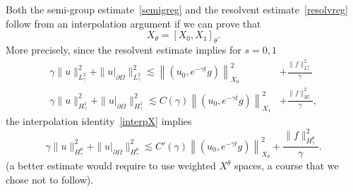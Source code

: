 \documentclass[AHL,Unicode,longabstracts,published]{cedram}
\begin{document}
Both the semi-group estimate~\eqref{semigreg} and the resolvent estimate~\eqref{resolvreg} follow from an interpolation argument if we can prove that
\begin{equation}\label{interpX}
X_\theta=[X_0,X_1]_\theta.
\end{equation}
More precisely, since the resolvent estimate implies for $s=0,1$
\begin{align*}
\gamma\|u\|_{L^2_\gamma}^2+\|u|_{\partial\Omega}\|^2_{L^2_\gamma}\lesssim \left\|\left(u_0,e^{-\gamma t}g\right)\right\|_{X_0}^2 &+\frac{\|f\|_{L^2_\gamma}^2}{\gamma}\\
\gamma\|u\|_{H^1_\gamma}^2+\|u|_{\partial\Omega}\|^2_{H^1_\gamma}\lesssim C(\gamma)\left\|\left(u_0,e^{-\gamma t}g\right)\right\|_{X_1}^2 &+\frac{\|f\|_{H^1_\gamma}^2}{\gamma},
\end{align*}
the interpolation identity~\eqref{interpX} implies
\begin{equation}\label{resolvsupersharp}
\gamma\|u\|_{H^\theta_\gamma}^2+\|u|_{\partial\Omega}\|^2_{H^\theta_\gamma}\lesssim C'(\gamma)\left\|\left(u_0,e^{-\gamma t}g\right)\right\|_{X_\theta}^2 +\frac{\|f\|_{H^\theta_\gamma}^2}{\gamma}.
\end{equation}
(a better estimate would require to use weighted $X^\theta$ spaces, a course that we chose not to follow).
\end{document}

